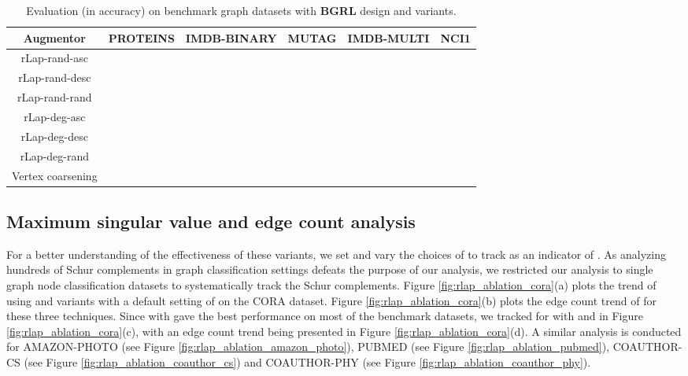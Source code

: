 \documentclass{article}
\theoremstyle{plain}
\theoremstyle{definition}
\theoremstyle{remark}
\begin{document}
\begin{table*}[ht!]
\centering
\caption{Evaluation (in accuracy) on benchmark graph datasets with \textbf{BGRL} design and  variants.}
\label{table:rlap_ablation_bgrl}
\vskip 0.15in
\begin{center}
\begin{small}
\begin{sc}
\begin{tabular}{c|c|c|c|c|c}
\toprule
Augmentor & PROTEINS & IMDB-BINARY & MUTAG & IMDB-MULTI & NCI1\\
\midrule
rLap-rand-asc &  &   &  &  &  \\
rLap-rand-desc & \underline{} &  &  &  &   \\
rLap-rand-rand &  &  &  &  &  \\
rLap-deg-asc &  & \underline{} & \underline{} &   & \underline{} \\
rLap-deg-desc &  &   &  &  &  \\
rLap-deg-rand &  &   &  & \underline{} &  \\
Vertex coarsening &  &  &  &  &  \\
\bottomrule
\end{tabular}
\end{sc}
\end{small}
\end{center}
\vskip -0.1in
\end{table*}

\subsection{Maximum singular value and edge count analysis}

For a better understanding of the effectiveness of these variants, we set  and vary the choices of  to track  as an indicator of . As analyzing hundreds of Schur complements in graph classification settings defeats the purpose of our analysis, we restricted our analysis to single graph node classification datasets to systematically track the Schur complements. Figure \ref{fig:rlap_ablation_cora}(a) plots the trend of  using  and  variants with a default setting of  on the CORA dataset. Figure \ref{fig:rlap_ablation_cora}(b) plots the edge count trend of  for these three techniques. Since  with  gave the best performance on most of the benchmark datasets, we tracked  for  with  and  in Figure \ref{fig:rlap_ablation_cora}(c), with an edge count trend being presented in Figure \ref{fig:rlap_ablation_cora}(d). A similar analysis is conducted for AMAZON-PHOTO (see Figure \ref{fig:rlap_ablation_amazon_photo}), PUBMED (see Figure \ref{fig:rlap_ablation_pubmed}), COAUTHOR-CS (see Figure \ref{fig:rlap_ablation_coauthor_cs}) and COAUTHOR-PHY (see Figure \ref{fig:rlap_ablation_coauthor_phy}).
\end{document}
